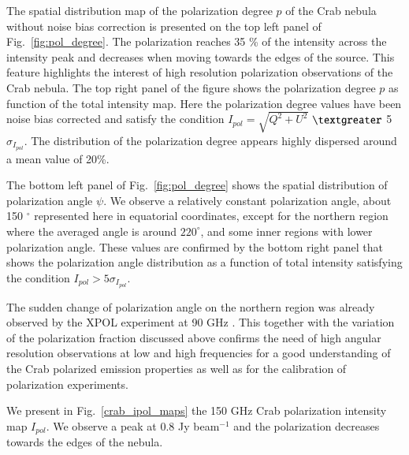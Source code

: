 \documentclass[twocolumn,traditabstract]{aa}
\begin{document}
The spatial distribution map of the polarization degree $p$ of the Crab nebula without
noise bias correction is presented on the top left panel of
Fig.~\ref{fig:pol_degree}. The polarization reaches 35 \% of the intensity
across the intensity peak and decreases when moving towards the edges of the
source.  This feature highlights the interest of high resolution polarization
observations of the Crab nebula. The top right panel of the figure shows the
polarization degree $p$ as function of the total intensity map. Here the
polarization degree values have been noise bias corrected and satisfy the
condition $I_{pol}=\sqrt{Q^2+U^2}$ $\textgreater$ 5 $\sigma_{I_{pol}}$. The
distribution of the polarization degree appears highly dispersed around a mean
value of 20\%.

The bottom left panel of Fig.~\ref{fig:pol_degree} shows the spatial distribution of polarization angle
$\psi$.  We observe a relatively constant polarization
angle, about 150 $^{\circ}$ represented here in equatorial coordinates, except
for the northern region where the averaged angle is around $220^{\circ}$, and
some inner regions with lower polarization angle.  These values are confirmed by
the bottom right panel that shows the polarization angle distribution as a
function of total intensity satisfying the condition $I_{pol} > 5\sigma_{I_{pol}}$.

The sudden change of polarization angle on the northern region was already
observed by the XPOL experiment at 90 GHz \citep{aumont2010}.  This together
with the variation of the polarization fraction discussed above confirms the
need of high angular resolution observations at low and high frequencies for a
good understanding of the Crab polarized emission properties as well as
  for the calibration of polarization experiments.

We present in Fig.~\ref{crab_ipol_maps} the 150 GHz Crab polarization intensity
map $I_{pol}$. We observe a peak at 0.8 Jy beam$^{-1}$ and the polarization
decreases towards the edges of the nebula.

\end{document}
